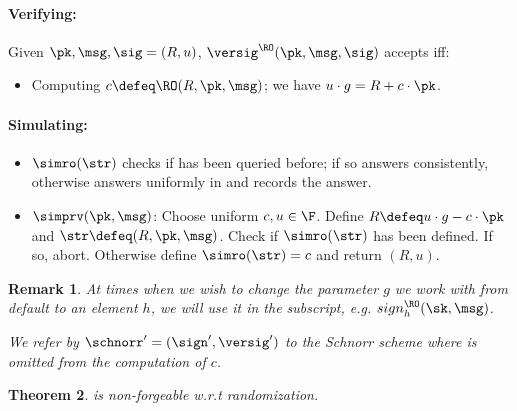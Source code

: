 \documentclass[11pt]{article}
\numberwithin{equation}{section} %
\numberwithin{figure}{section} %
\newtheorem{thm}{Theorem}[section]
\newtheorem{remark}[thm]{Remark}
\begin{document}
\paragraph{Verifying:}
 Given $\pk,\msg,\sig=(R,u)$, $\versig^{\RO}(\pk,\msg,\sig)$ 
 accepts iff:

\begin{itemize}
 \item Computing $c\defeq \RO(R,\pk,\msg)$; we have $u\cdot g = R+c\cdot \pk$.
\end{itemize}
\paragraph{Simulating:}
\begin{itemize}
\item $\simro(\str)$ checks if \str has been queried before; if so answers consistently, otherwise answers uniformly in \F and records the answer. 
 \item $\simprv(\pk,\msg)$: Choose uniform $c,u \in \F$. Define $R\defeq u\cdot g - c\cdot \pk$
 and $\str \defeq (R , \pk,\msg )$.
 Check if $\simro(\str)$ has been defined.
 If so, abort.  Otherwise define $\simro(\str)=c$ and return $(R,u)$.
\end{itemize}
\begin{remark}
 At times when we wish to change the parameter $g$ we work with from default to an element $h$,
 we will use it in the subscript, e.g. $sign_h^{\RO}(\sk,\msg)$.
 
 We refer by $\schnorr' = (\sign',\versig')$ to the Schnorr scheme where \pk is omitted from the computation of $c$.
\end{remark}
\begin{thm}\label{thm:schnorr-nf}
\schnorr is non-forgeable w.r.t randomization.
\end{thm}
\end{document}
